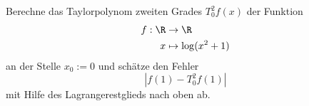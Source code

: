 \begin{prob}
Berechne das Taylorpolynom  zweiten Grades $T_0^2f(x)$ der Funktion 
\begin{equation*}
\begin{split}
f:\R&\to\R\\
x&\mapsto \log(x^2+1)
\end{split}
\end{equation*}
an der Stelle $x_0:=0$ und schätze den Fehler
$$|f(1)-T_0^2f(1)|$$
mit Hilfe des Lagrangerestglieds nach oben ab. 
\end{prob}

